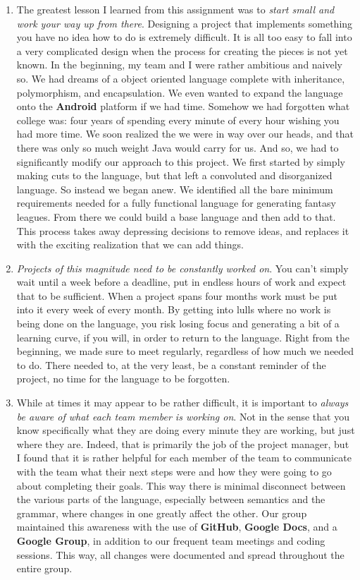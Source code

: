 \documentclass[12pt]{report}
\begin{document}
\begin{enumerate}
\item The greatest lesson I learned from this assignment was to \textit{start small and work your way up from there}. Designing a project that implements something you have no idea how to do is extremely difficult. It is all too easy to fall into a very complicated design when the process for creating the pieces is not yet known. In the beginning, my team and I were rather ambitious and naively so. We had dreams of a object oriented language complete with inheritance, polymorphism, and encapsulation. We even wanted to expand the language onto the \textbf{Android} platform if we had time. Somehow we had forgotten what college was: four years of spending every minute of every hour wishing you had more time. We soon realized the we were in way over our heads, and that there was only so much weight Java would carry for us. And so, we had to significantly modify our approach to this project. We first started by simply making cuts to the language, but that left a convoluted and disorganized language. So instead we began anew. We identified all the bare minimum requirements needed for a fully functional language for generating fantasy leagues. From there we could build a base language and then add to that. This process takes away depressing decisions to remove ideas, and replaces it with the exciting realization that we can add things.
\item \textit{Projects of this magnitude need to be constantly worked on}. You can't simply wait until a week before a deadline, put in endless hours of work and expect that to be sufficient. When a project spans four months work must be put into it every week of every month. By getting into lulls where no work is being done on the language, you risk losing focus and generating a bit of a learning curve, if you will, in order to return to the language. Right from the beginning, we made sure to meet regularly, regardless of how much we needed to do. There needed to, at the very least, be a constant reminder of the project, no time for the language to be forgotten.
\item While at times it may appear to be rather difficult, it is important to \textit{always be aware of what each team member is working on}. Not in the sense that you know specifically what they are doing every minute they are working, but just where they are. Indeed, that is primarily the job of the project manager, but I found that it is rather helpful for each member of the team to communicate with the team what their next steps were and how they were going to go about completing their goals. This way there is minimal disconnect between the various parts of the language, especially between semantics and the grammar, where changes in one greatly affect the other. Our group maintained this awareness with the use of \textbf{GitHub}, \textbf{Google Docs}, and a \textbf{Google Group}, in addition to our frequent team meetings and coding sessions. This way, all changes were documented and spread throughout the entire group.

\end{enumerate}
\end{document}

